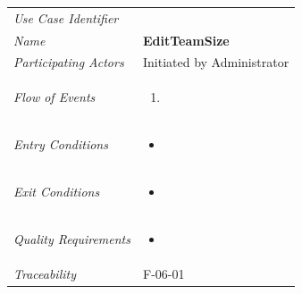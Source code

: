 \documentclass[12pt,letterpaper]{article}
\begin{document}
\begin{center}
	\begin{tabu} to 
		\toprule
		Use Case Identifier & \editteamsize{} \\
		Name & {\bf EditTeamSize} \\
		Participating Actors & Initiated by Administrator \\
		Flow of Events & 
	    \begin{enumerate}[topsep=-1em,leftmargin=*]
		    \item 
		\end{enumerate} \\

		Entry Conditions &
		\begin{itemize}[topsep=-1em,leftmargin=*]
		    \item 
        \end{itemize} \\

		Exit Conditions &
		\begin{itemize}[topsep=-1em,leftmargin=*]
		    \item 
        \end{itemize} \\

		Quality Requirements &
		\begin{itemize}[topsep=-1em,leftmargin=*]
		    \item 
        \end{itemize} \\

		Traceability & F-06-01 \\
		\toprule
	\end{tabu}
\end{center}
\end{document}
